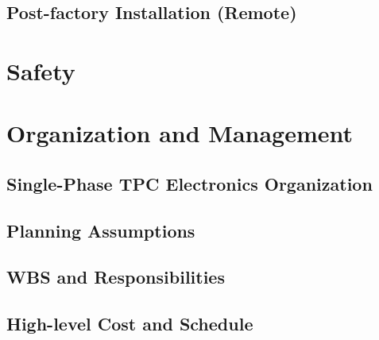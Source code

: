 \subsection{Post-factory Installation (Remote)}
\label{sec:fdsp-install-qc-remote}





\section{Safety}
\label{sec:fdsp-install-safety}






\section{Organization and Management}
\label{sec:fdsp-install-org}

\subsection{Single-Phase TPC Electronics Organization}
\label{sec:fdsp-install-org-consortium}


\subsection{Planning Assumptions}
\label{sec:fdsp-install-org-assmp}


\subsection{WBS and Responsibilities}
\label{sec:fdsp-install-org-wbs}

\subsection{High-level Cost and Schedule}
\label{sec:fdsp-install-org-cs}














